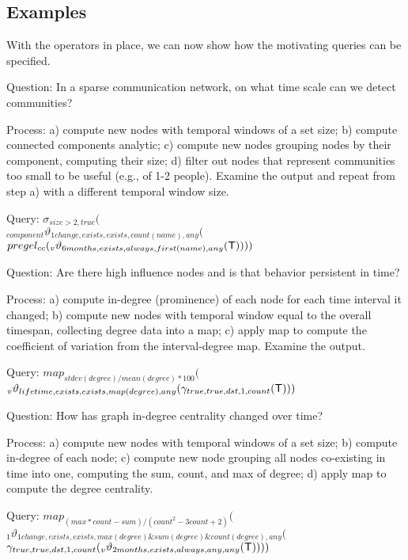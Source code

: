 \subsection{Examples}
\label{sec:example}

With the \ql operators in place, we can now show how the motivating
queries can be specified.

Question: In a sparse communication network, on what time scale can we
detect communities?

Process: a) compute new nodes with temporal windows of a set size; b)
compute connected components analytic; c) compute new nodes grouping
nodes by their component, computing their size; d) filter out nodes
that represent communities too small to be useful (e.g., of 1-2
people).  Examine the output and repeat from step a) with a different
temporal window size.

Query: $\sigma_{size > 2,true}($ \\ $ _{component}\vartheta_{1
  change,exists,exists,count(name),any}($ \\ $ pregel_{cc} (_v\vartheta_{6
  months,exists,always,first(name),any}( \mathsf{T}))))$

Question: Are there high influence nodes and is that behavior
persistent in time?

Process: a) compute in-degree (prominence) of each node for each time
interval it changed; b) compute new nodes with temporal window equal
to the overall timespan, collecting degree data into a map; c) apply
map to compute the coefficient of variation from the interval-degree
map.  Examine the output.

Query: $map_{stdev(degree)/mean(degree)*100}($ \\ 
$ _v\vartheta_{lifetime,exists,exists,map(degree),any}(
\gamma_{true,true,dst,1,count}( \mathsf{T})))$

Question: How has graph in-degree centrality changed over time?

Process: a) compute new nodes with temporal windows of a set size; b)
compute in-degree of each node; c) compute new node grouping all nodes
co-existing in time into one, computing the sum, count, and max of
degree; d) apply map to compute the degree centrality.

Query: $map_{(max*count-sum)/(count^2-3count+2)}($ \\
$ _1\vartheta_{1 change,exists,exists,max(degree)\&sum(degree)\&count(degree),any}($ \\
$ \gamma_{true,true,dst,1,count}( _v\vartheta_{2 months,exists,always,any,any}( \mathsf{T}))))$
